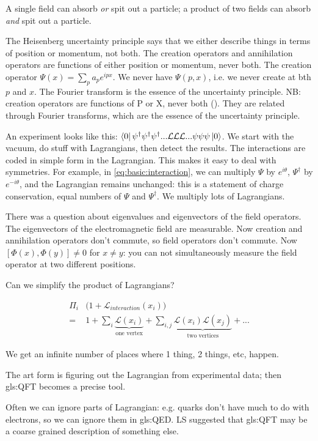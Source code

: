 \documentclass[]{article}
\begin{document}
A single field can absorb \emph{or} spit out a particle; a product of two fields can absorb \emph{and} spit out a particle.

The Heisenberg uncertainty principle says that we either describe things in terms of position or momentum, not both. The creation operators and annihilation operators are functions of either position or momentum, never both. The creation operator $\Psi(x)=\sum_{p}a_pe^{ipx}$. We never have $\Psi(p,x)$, i.e. we never create at bth $p$ and $x$. The Fourier transform is the essence of the uncertainty principle.
NB: creation operators are functions of P or X, never both (). They are related through Fourier transforms, which are the essence of the uncertainty principle.

An experiment looks like this: $\bra{0}\psi^\dagger\psi^\dagger\psi^\dagger...\mathcal{L}\mathcal{L}\mathcal{L}...\psi\psi\psi\ket{0}$. We start with the vacuum, do stuff with Lagrangians, then detect the results. The interactions are coded in simple form in the Lagrangian. This makes it easy to deal with symmetries. For example, in \eqref{eq:basic:interaction}, we can multiply $\Psi$ by $e^{i\theta}$, $\Psi^\dagger$ by $e^{-i\theta}$, and the Lagrangian remains unchanged: this is a statement of charge conservation, equal numbers of $\Psi$  and  $\Psi^\dagger$. We multiply lots of Lagrangians.

There was a question about eigenvalues and eigenvectors of the field operators. The eigenvectors of the electromagnetic field are measurable. Now creation and annihilation operators don't commute, so field operators don't commute. Now $[\Phi(x),\Phi(y)]\ne 0$ for $x\ne y$: you can not simultaneously measure the field operator at two different positions.

Can we simplify the product of Lagrangians?

\begin{align*}
	\Pi_i& \big(1+\mathcal{L}_{interaction}(x_i)\big)\\
	=&1 + \sum_i \underbrace{ \mathcal{L}(x_i)}_\text{one vertex}  +\sum_{i,j}\underbrace{\mathcal{L}(x_i)\mathcal{L}(x_j)}_\text{two vertices} +...
\end{align*}

We get an infinite number of places where 1 thing, 2 things, etc, happen.

The art form is figuring out the Lagrangian from experimental data; then \glsdesc{gls:QFT} becomes a precise tool.

Often we can ignore parts of Lagrangian: e.g. quarks don't have much to do with electrons, so we can ignore them in \glsdesc{gls:QED}. LS suggested that \glsdesc{gls:QFT} may be a coarse grained description of something else.
 
\end{document}
